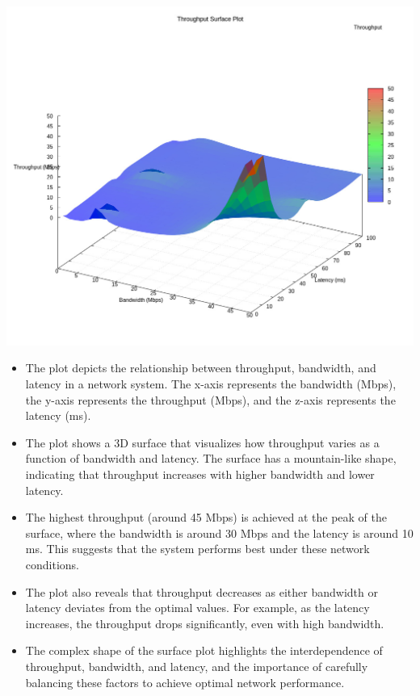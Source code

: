 \documentclass[11pt,a4paper]{article}
\begin{document}
\begin{tcolorbox}[colframe=green!70!black, colback=green!10!white, boxrule=0.4pt, width=\textwidth, sharp corners]
    \begin{center}
        \includegraphics[width=1\columnwidth]{images/throughput-4.jpg}
    \end{center}
    \begin{itemize}
        \item The plot depicts the relationship between throughput, bandwidth, and latency in a network system. The x-axis represents the bandwidth (Mbps), the y-axis represents the throughput (Mbps), and the z-axis represents the latency (ms).
        \item The plot shows a 3D surface that visualizes how throughput varies as a function of bandwidth and latency. The surface has a mountain-like shape, indicating that throughput increases with higher bandwidth and lower latency.
        \item The highest throughput (around 45 Mbps) is achieved at the peak of the surface, where the bandwidth is around 30 Mbps and the latency is around 10 ms. This suggests that the system performs best under these network conditions.
        \item The plot also reveals that throughput decreases as either bandwidth or latency deviates from the optimal values. For example, as the latency increases, the throughput drops significantly, even with high bandwidth.
        \item The complex shape of the surface plot highlights the interdependence of throughput, bandwidth, and latency, and the importance of carefully balancing these factors to achieve optimal network performance.
    \end{itemize}
\end{tcolorbox}
\end{document}
